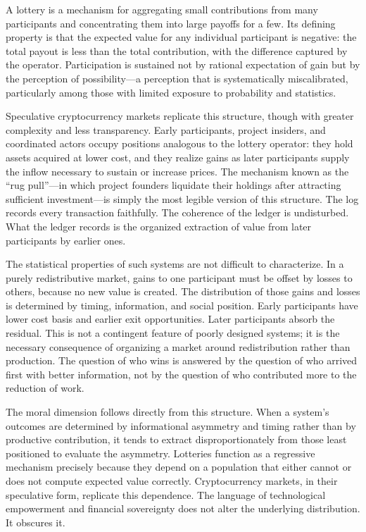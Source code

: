 \documentclass[12pt, oneside]{article}
\theoremstyle{definition}
\begin{document}
A lottery is a mechanism for aggregating small contributions from many participants and concentrating them into large payoffs for a few. Its defining property is that the expected value for any individual participant is negative: the total payout is less than the total contribution, with the difference captured by the operator. Participation is sustained not by rational expectation of gain but by the perception of possibility---a perception that is systematically miscalibrated, particularly among those with limited exposure to probability and statistics.

Speculative cryptocurrency markets replicate this structure, though with greater complexity and less transparency. Early participants, project insiders, and coordinated actors occupy positions analogous to the lottery operator: they hold assets acquired at lower cost, and they realize gains as later participants supply the inflow necessary to sustain or increase prices. The mechanism known as the ``rug pull''---in which project founders liquidate their holdings after attracting sufficient investment---is simply the most legible version of this structure. The log records every transaction faithfully. The coherence of the ledger is undisturbed. What the ledger records is the organized extraction of value from later participants by earlier ones.

The statistical properties of such systems are not difficult to characterize. In a purely redistributive market, gains to one participant must be offset by losses to others, because no new value is created. The distribution of those gains and losses is determined by timing, information, and social position. Early participants have lower cost basis and earlier exit opportunities. Later participants absorb the residual. This is not a contingent feature of poorly designed systems; it is the necessary consequence of organizing a market around redistribution rather than production. The question of who wins is answered by the question of who arrived first with better information, not by the question of who contributed more to the reduction of work.

The moral dimension follows directly from this structure. When a system's outcomes are determined by informational asymmetry and timing rather than by productive contribution, it tends to extract disproportionately from those least positioned to evaluate the asymmetry. Lotteries function as a regressive mechanism precisely because they depend on a population that either cannot or does not compute expected value correctly. Cryptocurrency markets, in their speculative form, replicate this dependence. The language of technological empowerment and financial sovereignty does not alter the underlying distribution. It obscures it.
\end{document}
